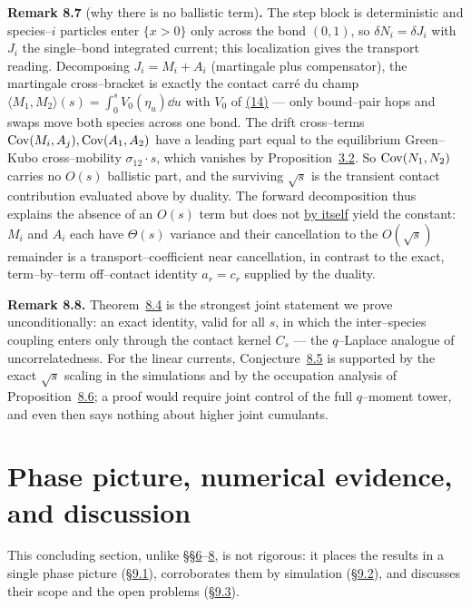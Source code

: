 \documentclass[11pt]{article}
\theoremstyle{plain}
\theoremstyle{definition}
\theoremstyle{remark}
\begin{document}
\label{rem_noballistic}\noindent\textbf{Remark 8.7} (why there is no ballistic term)\textbf{.} 
The step block is deterministic and species--$i$ particles enter $\{x>0\}$ only across
the bond $(0,1)$, so $\delta N_i=\delta J_i$ with $J_i$ the single--bond integrated
current; this localization gives the transport reading. Decomposing
$J_i=M_i+A_i$ (martingale plus compensator), the martingale cross--bracket is exactly the
contact carr\'e du champ $\langle M_1,M_2\rangle(s)=\int_0^s V_0(\eta_u)\dd u$ with $V_0$
of \hyperref[eq_Vdef]{(14)} --- only bound--pair hops and swaps move both species across one bond.
The drift cross--terms $\operatorname{Cov}(M_i,A_j),\operatorname{Cov}(A_1,A_2)$ have a leading part equal to the
equilibrium Green--Kubo cross--mobility $\sigma_{12}\cdot s$, which vanishes by
Proposition~\hyperref[prop_cross]{3.2}. So $\operatorname{Cov}(N_1,N_2)$ carries no $O(s)$ ballistic part, and
the surviving $\sqrt s$ is the transient contact contribution evaluated above by duality.
The forward decomposition thus explains the absence of an $O(s)$ term but does not
\underline{by itself} yield the constant: $M_i$ and $A_i$ each have $\Theta(s)$ variance and
their cancellation to the $O(\sqrt s)$ remainder is a transport--coefficient near
cancellation, in contrast to the exact, term--by--term off--contact identity
$a_r=c_r$ supplied by the duality.
\par

\label{rem_uncorr}\noindent\textbf{Remark 8.8.} 
Theorem~\hyperref[thm_cov]{8.4} is the strongest joint statement we prove unconditionally: an
exact identity, valid for all $s$, in which the inter--species coupling enters only
through the contact kernel $C_s$ --- the $q$--Laplace analogue of uncorrelatedness.
For the linear currents, Conjecture~\hyperref[conj_cov]{8.5} is supported by the exact
$\sqrt s$ scaling in the simulations and by the occupation analysis of
Proposition~\hyperref[prop_occ]{8.6}; a proof would require joint control of the full
$q$--moment tower, and even then says nothing about higher joint cumulants.
\par

\section{Phase picture, numerical evidence, and discussion}\label{sec_summary}

This concluding section, unlike \S\S\hyperref[sec_ew]{6}--\hyperref[sec_tw]{8}, is not rigorous: it
places the results in a single phase picture (\S\hyperref[sec_phase]{9.1}), corroborates them by
simulation (\S\hyperref[sec_numerics]{9.2}), and discusses their scope and the open problems
(\S\hyperref[sec_disc]{9.3}).
\end{document}
